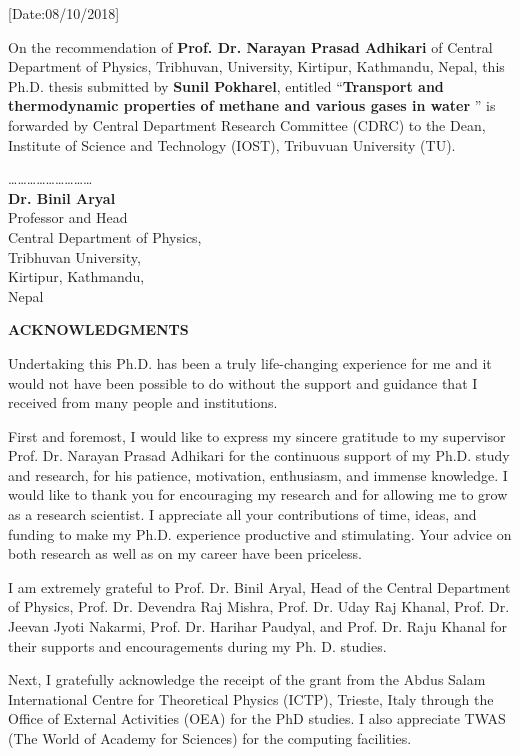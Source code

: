 \vspace*{2.0cm}

[Date:08/10/2018] 

On the recommendation of \textbf{Prof. Dr. Narayan Prasad Adhikari} of Central Department of Physics, Tribhuvan, University, Kirtipur, Kathmandu, Nepal, this Ph.D. thesis submitted by \textbf{Sunil Pokharel}, entitled ``\textbf{Transport and thermodynamic properties of methane  and various gases in water }'' is forwarded by Central Department Research Committee (CDRC) to the Dean, Institute of Science and Technology (IOST), Tribuvuan University (TU).

\vskip 3.0cm
\dots\dots\dots\dots\dots\dots\dots\dots\dots \\
{\bf Dr. Binil Aryal} \\
Professor and Head \\
Central Department of Physics, \\
Tribhuvan University, \\
Kirtipur, Kathmandu, \\
Nepal

\newpage
{}
{}
\centerline{\Large\bf ACKNOWLEDGMENTS}
\vspace{1cm}
Undertaking this Ph.D. has been  a  truly life-changing experience for me  and it would not have been possible  to do without the support and guidance  that I received from many people and institutions.   

First and foremost, I would like to express my sincere gratitude to my supervisor Prof. Dr. Narayan Prasad Adhikari for the continuous support of my Ph.D. study and research, for his patience, motivation, enthusiasm, and immense knowledge. I would like to thank you for encouraging my research and for allowing me to grow as a research scientist. I appreciate all your contributions of time, ideas, and funding to make my Ph.D. experience productive and stimulating. Your advice on both research as well as on my career have been priceless.

I am extremely grateful to Prof. Dr. Binil Aryal, Head of the Central Department of
Physics, Prof. Dr. Devendra Raj Mishra, Prof. Dr. Uday Raj Khanal, Prof. Dr. Jeevan
Jyoti Nakarmi,  Prof. Dr. Harihar Paudyal, and Prof. Dr. Raju Khanal for their supports and encouragements during my Ph. D. studies. 




Next, I gratefully acknowledge the receipt of the grant from the Abdus Salam International Centre for Theoretical Physics (ICTP), Trieste, Italy through the Office of External Activities (OEA) for the PhD studies. I also appreciate TWAS (The World of Academy for Sciences) for the computing facilities.

